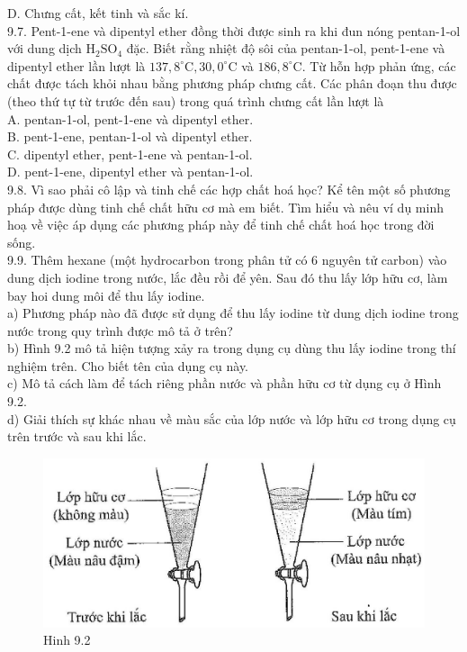 \documentclass[10pt]{article}
\begin{document}
D. Chưng cất, kết tinh và sắc kí.\\
9.7. Pent-1-ene và dipentyl ether đồng thời được sinh ra khi đun nóng pentan-1-ol với dung dịch $\mathrm{H}_{2} \mathrm{SO}_{4}$ đặc. Biết rằng nhiệt độ sôi của pentan-1-ol, pent-1-ene và dipentyl ether lần lượt là $137,8^{\circ} \mathrm{C}, 30,0^{\circ} \mathrm{C}$ và $186,8^{\circ} \mathrm{C}$. Từ hỗn hợp phản ứng, các chất được tách khỏi nhau bằng phương pháp chưng cất. Các phân đoạn thu được (theo thứ tự từ trước đến sau) trong quá trình chưng cất lần lượt là\\
A. pentan-1-ol, pent-1-ene và dipentyl ether.\\
B. pent-1-ene, pentan-1-ol và dipentyl ether.\\
C. dipentyl ether, pent-1-ene và pentan-1-ol.\\
D. pent-1-ene, dipentyl ether và pentan-1-ol.\\
9.8. Vì sao phải cô lập và tinh chế các hợp chất hoá học? Kể tên một số phương pháp được dùng tinh chế chất hữu cơ mà em biết. Tìm hiểu và nêu ví dụ minh hoạ về việc áp dụng các phương pháp này để tinh chế chất hoá học trong đời sống.\\
9.9. Thêm hexane (một hydrocarbon trong phân tử có 6 nguyên tử carbon) vào dung dịch iodine trong nước, lắc đều rồi để yên. Sau đó thu lấy lớp hữu cơ, làm bay hoi dung môi để thu lấy iodine.\\
a) Phương pháp nào đã được sử dụng để thu lấy iodine từ dung dịch iodine trong nước trong quy trình được mô tả ở trên?\\
b) Hình 9.2 mô tả hiện tượng xảy ra trong dụng cụ dùng thu lấy iodine trong thí nghiệm trên. Cho biết tên của dụng cụ này.\\
c) Mô tả cách làm để tách riêng phần nước và phần hữu cơ từ dụng cụ ở Hình 9.2.\\
d) Giải thích sự khác nhau về màu sắc của lớp nước và lớp hữu cơ trong dụng cụ trên trước và sau khi lắc.

\begin{figure}[h]
\begin{center}
  \includegraphics[width=\textwidth]{2025_10_23_f2823ef970776205e47bg-28(1)}
\captionsetup{labelformat=empty}
\caption{Hinh 9.2}
\end{center}
\end{figure}
\end{document}
